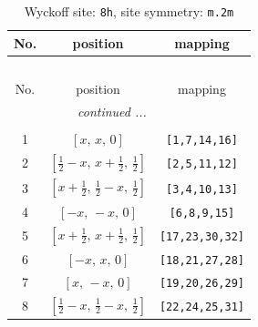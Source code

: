 \documentclass[fleqn,8pt]{jsarticle}
\begin{document}
\begin{longtable}{ccc}
\caption{Wyckoff site: {\tt 8h}, site symmetry: {\tt m.2m}}
 \\
 \hline \hline
No. & position & mapping \\ \hline \endfirsthead

\multicolumn{2}{l}{\tablename\ \thetable{}} \\
 \hline \hline
No. & position & mapping \\ \hline \endhead

 \hline \hline
\multicolumn{2}{r}{\footnotesize\it continued ...} \\ \endfoot

 \hline \hline
\multicolumn{2}{r}{} \\ \endlastfoot

1 & $\left[ x,\, x,\, 0 \right]$ & {\tt [1,7,14,16]} \\ \hline
2 & $\left[ \frac{1}{2} - x,\, x + \frac{1}{2},\, \frac{1}{2} \right]$ & {\tt [2,5,11,12]} \\ \hline
3 & $\left[ x + \frac{1}{2},\, \frac{1}{2} - x,\, \frac{1}{2} \right]$ & {\tt [3,4,10,13]} \\ \hline
4 & $\left[ - x,\, - x,\, 0 \right]$ & {\tt [6,8,9,15]} \\ \hline
5 & $\left[ x + \frac{1}{2},\, x + \frac{1}{2},\, \frac{1}{2} \right]$ & {\tt [17,23,30,32]} \\ \hline
6 & $\left[ - x,\, x,\, 0 \right]$ & {\tt [18,21,27,28]} \\ \hline
7 & $\left[ x,\, - x,\, 0 \right]$ & {\tt [19,20,26,29]} \\ \hline
8 & $\left[ \frac{1}{2} - x,\, \frac{1}{2} - x,\, \frac{1}{2} \right]$ & {\tt [22,24,25,31]} \\
\end{longtable}
\renewcommand{\arraystretch}{1.2}
\end{document}
